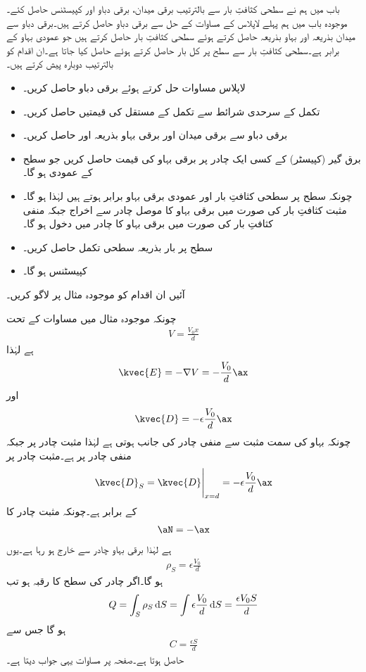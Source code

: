 باب  میں ہم نے سطحی کثافتِ بار سے بالترتیب برقی میدان، برقی دباو اور کپیسٹنس حاصل کئے۔موجودہ باب میں ہم پہلے لاپلاس کے مساوات کے حل سے برقی دباو حاصل کرتے ہیں۔برقی دباو سے میدان بذریعہ   اور بہاو بذریعہ  حاصل کرتے ہوئے سطحی کثافتِ بار حاصل کرتے ہیں جو عمودی بہاو کے برابر ہے۔سطحی کثافتِ بار سے سطح پر کل بار حاصل کرتے ہوئے  حاصل کیا جاتا ہے۔ان اقدام کو بالترتیب دوبارہ پیش کرتے ہیں۔
\begin{itemize}
\item
لاپلاس مساوات حل کرتے ہوئے برقی دباو  حاصل کریں۔
\item
تکمل کے سرحدی شرائط سے تکمل کے مستقل کی قیمتیں حاصل کریں۔
\item
برقی دباو سے برقی میدان اور برقی بہاو  بذریعہ  اور  حاصل کریں۔
\item
برق گیر (کپیسٹر)  کے کسی ایک چادر پر برقی بہاو کی قیمت  حاصل کریں جو سطح کے عمودی ہو گا۔ 
\item
چونکہ سطح پر سطحی کثافتِ بار اور عمودی برقی بہاو برابر ہوتے ہیں لہٰذا  ہو گا۔مثبت کثافتِ بار کی صورت میں برقی بہاو کا موصل چادر سے اخراج جبکہ منفی کثافتِ بار کی صورت میں برقی بہاو کا چادر میں دخول ہو گا۔
\item
سطح پر بار بذریعہ سطحی تکمل حاصل کریں۔
\item
کپیسٹنس  ہو گا۔
\end{itemize}
آئیں ان اقدام کو موجودہ مثال پر لاگو کریں۔

چونکہ موجودہ مثال میں مساوات  کے تحت
\begin{align*}
V=\frac{V_0x}{d}
\end{align*}
ہے لہٰذا
\begin{align*}
\kvec{E}=-\nabla V=-\frac{V_0}{d}\ax
\end{align*}
اور
\begin{align*}
\kvec{D}=-\epsilon \frac{V_0}{d}\ax
\end{align*}
چونکہ بہاو کی سمت مثبت سے منفی چادر کی جانب ہوتی ہے لہٰذا مثبت چادر  پر جبکہ منفی چادر  پر ہے۔مثبت چادر پر
\begin{align*}
\kvec{D}_S=\eval{\kvec{D}}_{x=d}=-\epsilon \frac{V_0}{d}\ax
\end{align*}
کے برابر ہے۔چونکہ مثبت چادر کا
\begin{align*}
\aN=-\ax
\end{align*}
ہے لہٰذا برقی بہاو چادر سے خارج ہو رہا ہے۔یوں
\begin{align*}
\rho_S=\epsilon \frac{V_0}{d}
\end{align*}
ہو گا۔اگر چادر کی سطح کا رقبہ  ہو تب
\begin{align*}
Q=\int_S \rho_S \dif S=\int \epsilon \frac{V_0}{d} \dif S=\frac{\epsilon V_0 S}{d}
\end{align*}
ہو گا جس سے
\begin{align*}
C=\frac{\epsilon S}{d}
\end{align*}
حاصل ہوتا ہے۔صفحہ  پر مساوات  یہی جواب دیتا ہے۔

